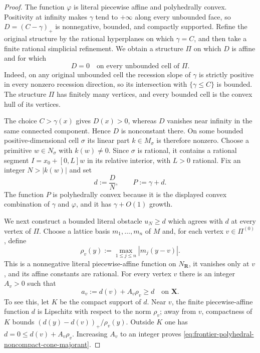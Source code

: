 
\begin{proof}
The function $\varphi$ is literal piecewise affine and polyhedrally convex.
Positivity at infinity makes $\gamma$ tend to $+\infty$ along every
unbounded face, so $D=(C-\gamma)_+$ is nonnegative, bounded, and compactly
supported.  Refine the original structure by the rational hyperplanes on
which $\gamma=C$, and then take a finite rational simplicial refinement.
We obtain a structure $\Pi$ on which $D$ is affine and for which
\begin{equation}
             D=0\quad\text{on every unbounded cell of }\Pi.
 \label{eq:frontier-polyhedral-noncompact-unbounded-zero}
\end{equation}
Indeed, on any original unbounded cell the recession slope of $\gamma$ is
strictly positive in every nonzero recession direction, so its intersection
with $\{\gamma\leq C\}$ is bounded.
The structure $\Pi$ has finitely many vertices, and every bounded cell is
the convex hull of its vertices.

The choice $C>\gamma(x)$ gives $D(x)>0$, whereas $D$ vanishes near infinity
in the same connected component.  Hence $D$ is nonconstant there.  On some
bounded positive-dimensional cell $\sigma$ its linear part
$k\in M_\sigma$ is therefore nonzero.  Choose a primitive
$w\in N_\sigma$ with $k(w)\neq0$.  Since $\sigma$ is rational, it contains a
rational segment $I=x_0+[0,L]w$ in its relative interior, with $L>0$
rational.  Fix an integer $N>|k(w)|$ and set
\[
                  d:=\frac{D}{N},
                  \qquad P:=\gamma+d.
\]
The function $P$ is polyhedrally convex because it is the displayed convex
combination of $\gamma$ and $\varphi$, and it has $\gamma+O(1)$ growth.

We next construct a bounded literal obstacle $u_N\geq d$ which agrees with
$d$ at every vertex of $\Pi$.  Choose a lattice basis
$m_1,\ldots,m_n$ of $M$ and, for each vertex $v\in\Pi^{(0)}$, define
\[
        \rho_v(y):=\max_{1\leq j\leq n}|m_j(y-v)|.
\]
This is a nonnegative literal piecewise-affine function on $N_{\mathbf R}$,
it vanishes only at $v$, and its affine constants are rational.  For every
vertex $v$ there is an integer $A_v>0$ such that
\begin{equation}
                 a_v:=d(v)+A_v\rho_v\geq d
                 \quad\text{on }\mathbf X.
 \label{eq:frontier-polyhedral-noncompact-cone-majorant}
\end{equation}
To see this, let $K$ be the compact support of $d$.  Near $v$, the finite
piecewise-affine function $d$ is Lipschitz with respect to the norm
$\rho_v$; away from $v$, compactness of $K$ bounds
$(d(y)-d(v))_+/\rho_v(y)$.  Outside $K$ one has $d=0\leq d(v)+A_v\rho_v$.
Increasing $A_v$ to an integer proves
\eqref{eq:frontier-polyhedral-noncompact-cone-majorant}.


\end{proof}
